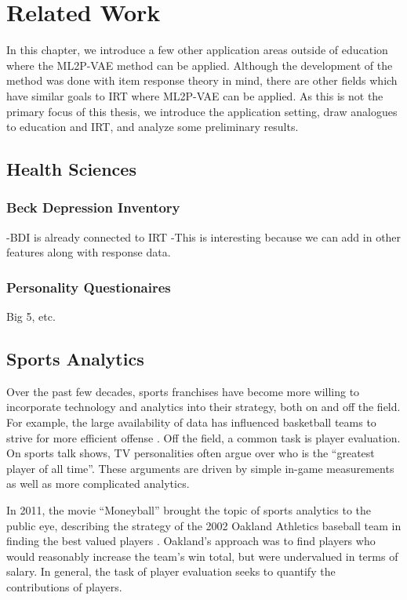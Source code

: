 \chapter{Related Work}\label{ch:related_work}

In this chapter, we introduce a few other application areas outside of education where the ML2P-VAE method can be applied. Although the development of the method was done with item response theory in mind, there are other fields which have similar goals to IRT where ML2P-VAE can be applied. As this is not the primary focus of this thesis, we introduce the application setting, draw analogues to education and IRT, and analyze some preliminary results.


\section{Health Sciences}

\subsection{Beck Depression Inventory}

-BDI is already connected to IRT
-This is interesting because we can add in other features along with response data.

\subsection{Personality Questionaires}
Big 5, etc.

\section{Sports Analytics}
Over the past few decades, sports franchises have become more willing to incorporate technology and analytics into their strategy, both on and off the field. For example, the large availability of data has influenced basketball teams to strive for more efficient offense . Off the field, a common task is player evaluation. On sports talk shows, TV personalities often argue over who is the ``greatest player of all time''. These arguments are driven by simple in-game measurements as well as more complicated analytics. 

In 2011, the movie ``Moneyball'' brought the topic of sports analytics to the public eye, describing the strategy of the 2002 Oakland Athletics baseball team in finding the best valued players . Oakland's approach was to find players who would reasonably increase the team's win total, but were undervalued in terms of salary. In general, the task of player evaluation seeks to quantify the contributions of players.

